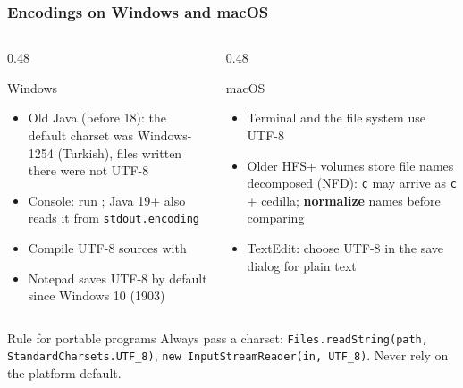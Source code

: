 \documentclass[aspectratio=169,10pt,compress]{beamer}
\begin{document}
\begin{frame}[t,fragile] \frametitle{Encodings on Windows and macOS}
  \begin{columns}[T]
    \begin{column}{0.48\textwidth}
      \begin{block}{Windows}
        \footnotesize
        \begin{itemize}
          \item Old Java (before 18): the default charset was Windows-1254 (Turkish), files written there were not UTF-8
          \item Console: run ; Java 19+ also reads it from \texttt{stdout.encoding}
          \item Compile UTF-8 sources with 
          \item Notepad saves UTF-8 by default since Windows 10 (1903)
        \end{itemize}
      \end{block}
    \end{column}
    \begin{column}{0.48\textwidth}
      \begin{block}{macOS}
        \footnotesize
        \begin{itemize}
          \item Terminal and the file system use UTF-8
          \item Older HFS+ volumes store file names decomposed (NFD): \texttt{ç} may arrive as \texttt{c} + cedilla;
                \textbf{normalize} names before comparing
          \item TextEdit: choose UTF-8 in the save dialog for plain text
        \end{itemize}
      \end{block}
    \end{column}
  \end{columns}
  \vspace{0.3em}
  \begin{alertblock}{Rule for portable programs}
    \small Always pass a charset: \texttt{Files.readString(path, StandardCharsets.UTF\_8)},
    \texttt{new InputStreamReader(in, UTF\_8)}. Never rely on the platform default.
  \end{alertblock}
\end{frame}

\end{document}
